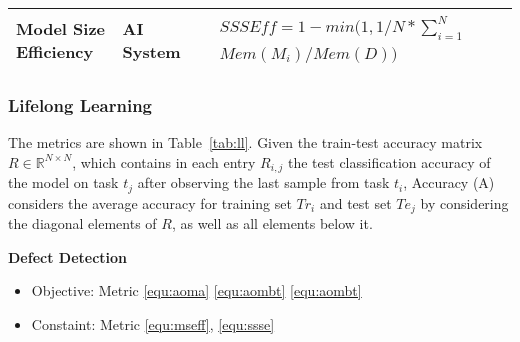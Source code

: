 \begin{table}[h!]
\begin{tabular}{|p{2cm}|l|p{6cm}|p{3cm}|p{1.5cm}|}
Model Size Efficiency
& AI System
& 
\parbox{3cm}{
    \begin{equation} \label{equ:ssse} 
    \begin{split}
& SSSEff = 1 - min(1, 1/N * \sum_{i=1}^N \\
& Mem(M_i) / Mem(D))
    \end{split} 
    \end{equation} 
}
&  
& \cite{DBLP:journals/corr/abs-1810-13166,DBLP:conf/nips/Lopez-PazR17}       
\\ \hline

\end{tabular}
\end{table}




\subsubsection{Lifelong Learning}

The metrics are shown in Table~\ref{tab:ll}. Given the train-test accuracy matrix $R \in \mathbb{R}^{N \times N}$, which contains in each entry $R_{i,j}$ the test classification accuracy of the model on task $t_j$ after observing the last sample from task $t_i$, Accuracy (A) considers the average accuracy for training set $Tr_i$ and test set $Te_j$ by considering the diagonal elements of $R$, as well as all elements below it. 

\vspace{0.2cm}
\noindent \textbf{Defect Detection}
\begin{itemize}
    \item Objective: Metric \ref{equ:aoma} \ref{equ:aombt} \ref{equ:aombt} 
    \item Constaint: Metric \ref{equ:mseff}, \ref{equ:ssse}  
\end{itemize}















